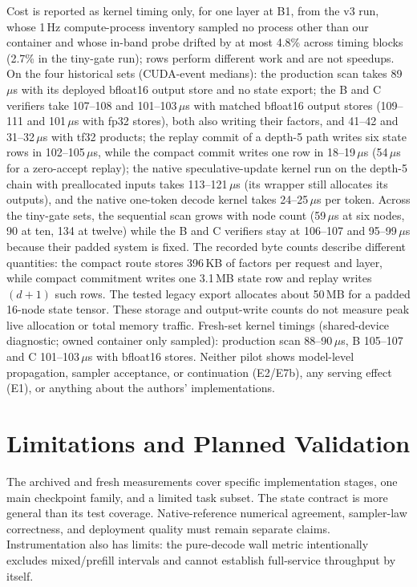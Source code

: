\documentclass[conference]{IEEEtran}
\begin{document}
Cost is reported as kernel timing only, for one layer at B1, from the v3 run, whose 1\,Hz compute-process inventory sampled no process other than our container and whose in-band probe drifted by at most 4.8\% across timing blocks (2.7\% in the tiny-gate run); rows perform different work and are not speedups. On the four historical sets (CUDA-event medians): the production scan takes 89\,$\mu$s with its deployed bfloat16 output store and no state export; the B and C verifiers take 107--108 and 101--103\,$\mu$s with matched bfloat16 output stores (109--111 and 101\,$\mu$s with fp32 stores), both also writing their factors, and 41--42 and 31--32\,$\mu$s with tf32 products; the replay commit of a depth-5 path writes six state rows in 102--105\,$\mu$s, while the compact commit writes one row in 18--19\,$\mu$s (54\,$\mu$s for a zero-accept replay); the native speculative-update kernel run on the depth-5 chain with preallocated inputs takes 113--121\,$\mu$s (its wrapper still allocates its outputs), and the native one-token decode kernel takes 24--25\,$\mu$s per token. Across the tiny-gate sets, the sequential scan grows with node count (59\,$\mu$s at six nodes, 90 at ten, 134 at twelve) while the B and C verifiers stay at 106--107 and 95--99\,$\mu$s because their padded system is fixed. The recorded byte counts describe different quantities: the compact route stores 396\,KB of factors per request and layer, while compact commitment writes one 3.1\,MB state row and replay writes $(d{+}1)$ such rows. The tested legacy export allocates about 50\,MB for a padded 16-node state tensor. These storage and output-write counts do not measure peak live allocation or total memory traffic. Fresh-set kernel timings (shared-device diagnostic; owned container only sampled): production scan 88--90\,$\mu$s, B 105--107 and C 101--103\,$\mu$s with bfloat16 stores. Neither pilot shows model-level propagation, sampler acceptance, or continuation (E2/E7b), any serving effect (E1), or anything about the authors' implementations.

\section{Limitations and Planned Validation}
\label{sec:planned}
The archived and fresh measurements cover specific implementation stages, one main checkpoint family, and a limited task subset. The state contract is more general than its test coverage. Native-reference numerical agreement, sampler-law correctness, and deployment quality must remain separate claims. Instrumentation also has limits: the pure-decode wall metric intentionally excludes mixed/prefill intervals and cannot establish full-service throughput by itself.
\end{document}
